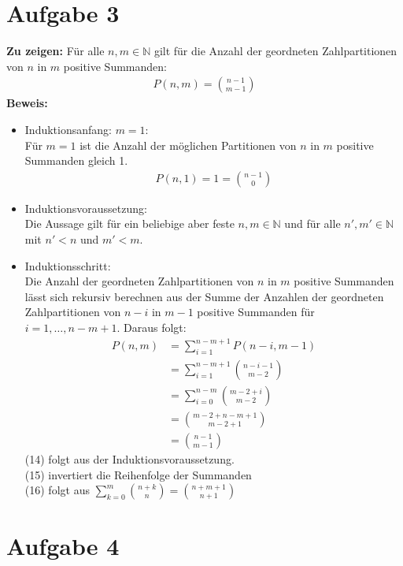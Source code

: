 \documentclass[a4paper]{scrartcl}
\begin{document}
\newpage
\section*{Aufgabe 3}
\textbf{Zu zeigen:} Für alle $ n, m \in \mathbb{N}$ gilt für die Anzahl der geordneten Zahlpartitionen von $n$ in $m$ positive Summanden:
\begin{align*}
    P(n,m) = \binom{n-1}{m-1}
\end{align*}
\textbf{Beweis:}
\begin{itemize}
    \item Induktionsanfang: $m = 1$: \\
    Für $ m = 1 $ ist die Anzahl der möglichen Partitionen von $ n $ in $ m $ positive Summanden gleich 1. \\
    \begin{align*}
        P(n,1) = 1 = \binom{n-1}{0}
    \end{align*}
    \item Induktionsvoraussetzung: \\
    Die Aussage gilt für ein beliebige aber feste $ n, m \in \mathbb{N}$ und für alle $ n', m' \in \mathbb{N} $ mit $ n' < n $ und $ m' < m $.
    \item Induktionsschritt:  \\
    Die Anzahl der geordneten Zahlpartitionen von $ n $ in $ m $ positive Summanden lässt sich rekursiv berechnen aus der Summe der Anzahlen der geordneten 
    Zahlpartitionen von $ n-i $ in $ m-1 $ positive Summanden für $ i = 1, \dots, n-m+1 $. Daraus folgt:
    \begin{align}
        P(n,m) &= \sum_{i=1}^{n-m+1} P(n-i, m-1) \\
        &= \sum_{i=1}^{n-m+1} \binom{n-i-1}{m-2} \\
        &= \sum_{i=0}^{n-m} \binom{m-2+i}{m-2} \\
        &= \binom{m-2+n-m+1}{m-2+1} \\
        &= \binom{n-1}{m-1}
    \end{align}
    (14) folgt aus der Induktionsvoraussetzung. \\
    (15) invertiert die Reihenfolge der Summanden \\
    (16) folgt aus $ \sum_{k=0}^m \binom{n + k}{n} = \binom{n + m + 1}{n + 1} $
\end{itemize}
    

\section*{Aufgabe 4}
\end{document}
